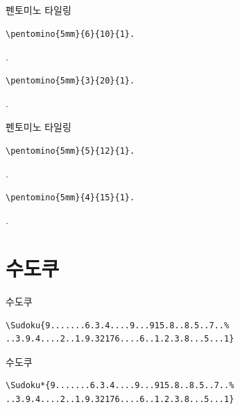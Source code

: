 \documentclass[xcolor=svgnames]{beamer}
\begin{document}
%
\begin{frame}[fragile]{펜토미노 타일링}
\begin{verbatim}
\pentomino{5mm}{6}{10}{1}.
\end{verbatim}
\vspace{-5mm}
.
\vspace{-5mm}
\begin{verbatim}
\pentomino{5mm}{3}{20}{1}.
\end{verbatim}
\vspace{-5mm}
.
\end{frame}

%
\begin{frame}[fragile]{펜토미노 타일링}
\begin{verbatim}
\pentomino{5mm}{5}{12}{1}.
\end{verbatim}
\vspace{-5mm}
.
\vspace{-5mm}
\begin{verbatim}
\pentomino{5mm}{4}{15}{1}.
\end{verbatim}
\vspace{-5mm}
.
\end{frame}


\section{수도쿠}

%
\begin{frame}[fragile]{수도쿠}
  \begin{Verbatim}[fontsize=\small]
\Sudoku{9.......6.3.4....9...915.8..8.5..7..%
..3.9.4....2..1.9.32176....6..1.2.3.8...5...1}
\end{Verbatim}  
\begin{center}
\end{center}
\end{frame}

%
\begin{frame}[fragile]{수도쿠}
\begin{Verbatim}[fontsize=\small]
\Sudoku*{9.......6.3.4....9...915.8..8.5..7..%
..3.9.4....2..1.9.32176....6..1.2.3.8...5...1}
\end{Verbatim}
\begin{center}
\end{center}
\end{frame}
\end{document}
